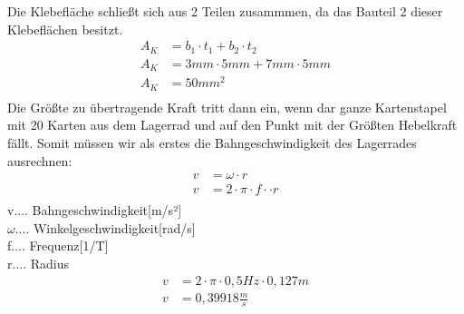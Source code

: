 Die Klebefläche schließt sich aus 2 Teilen zusammmen, da das Bauteil 2 dieser Klebeflächen besitzt.
\begin{align*}
A_{K} &= b_{1}\cdot t_{1}+b_{2}\cdot t_{2}\\
A_{K} &=3 mm\cdot 5 mm+7 mm\cdot 5 mm\\
A_{K} &= 50 mm^{2}\\
\end{align*}
Die Größte zu übertragende Kraft tritt dann ein, wenn dar ganze Kartenstapel mit 20 Karten aus dem
Lagerrad und auf den Punkt mit der Größten Hebelkraft fällt. Somit müssen wir als erstes die
Bahngeschwindigkeit des Lagerrades ausrechnen:
\begin{align*}
v &= \omega \cdot r\\
v &= 2 \cdot \pi \cdot f \cdot \cdot r\\
\end{align*}
v.... Bahngeschwindigkeit[m/s²]\\
$\omega$.... Winkelgeschwindigkeit[rad/s]\\
f.... Frequenz[1/T]\\
r.... Radius\\
\begin{align*}
v &= 2 \cdot \pi \cdot 0,5 Hz \cdot 0,127 m\\
v &= 0,39918 \tfrac{m}{s}\\
\end{align*}

